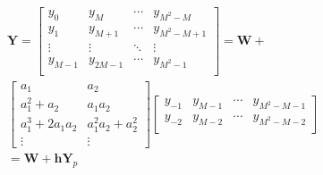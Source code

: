 \begin{equation}
    \label{eq:ICC_wo_trans}
    \begin{aligned}
        &\bm{Y} = \left[\begin{array}{c|c|c|c}
            y_0 & y_M & \cdots & y_{M^2-M} \\ 
            y_1 & y_{M+1} & \cdots & y_{M^2-M+1} \\
            \vdots & \vdots & \ddots & \vdots \\
            y_{M-1} & y_{2M-1} &\cdots & y_{M^2-1} \\
            \end{array}\right] = \bm{W} + \\
            &\left[\begin{array}{cc}
                a_1 & a_2 \\ 
                a_1^2+a_2 & a_1a_2 \\
                a_1^3+2a_1a_2 & a_1^2a_2+a_2^2 \\
                \vdots & \vdots
                \end{array}\right]  
                \left[\begin{array}{cccc}
                    y_{-1} & y_{M-1} & \cdots & y_{M^2-M-1} \\ 
                    y_{-2} & y_{M-2} & \cdots & y_{M^2-M-2} \\
                    \end{array}\right] \\
            &= \bm{W} + \bm{h}\bm{Y}_p
    \end{aligned}
\end{equation}

